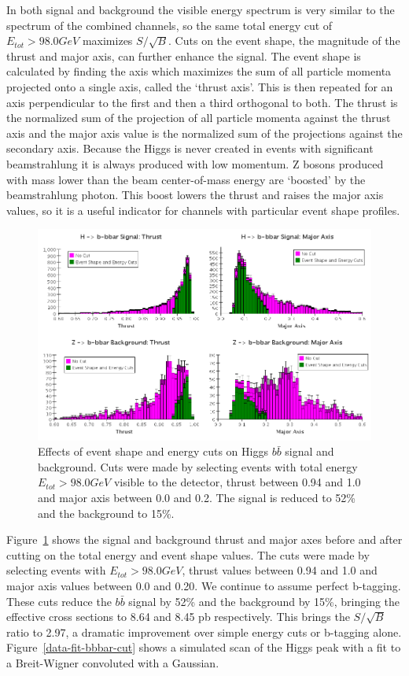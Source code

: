 \documentclass[a4paper]{article}
\begin{document}
	In both signal and background the visible energy spectrum is very similar to the spectrum of the combined channels, so the same total energy cut of $E_{tot}>98.0 GeV$ maximizes $S/\sqrt{B}$. Cuts on the event shape, the magnitude of the thrust and major axis, can further enhance the signal. The event shape is calculated by finding the axis which maximizes the sum of all particle momenta projected onto a single axis, called the `thrust axis'. This is then repeated for an axis perpendicular to the first and then a third orthogonal to both. The thrust is the normalized sum of the projection of all particle momenta against the thrust axis and the major axis value is the normalized sum of the projections against the secondary axis. Because the Higgs is never created in events with significant beamstrahlung it is always produced with low momentum. Z bosons produced with mass lower than the beam center-of-mass energy are `boosted' by the beamstrahlung photon. This boost lowers the thrust and raises the major axis values, so it is a useful indicator for channels with particular event shape profiles.
	
\begin{figure}
	\includegraphics[width=\textwidth]{bbbar-en-thrust-cuts}
	\caption{Effects of event shape and energy cuts on Higgs $b\bar{b}$ signal and background. Cuts were made by selecting events with total energy $E_{tot} > 98.0GeV$ visible to the detector, thrust between 0.94 and 1.0 and major axis between 0.0 and 0.2. The signal is reduced to 52\% and the background to 15\%.}
\label{bbbar-en-thrust-cuts}
\end{figure}

Figure~\ref{bbbar-en-thrust-cuts} shows the signal and background thrust and major axes before and after cutting on the total energy and event shape values. The cuts were made by selecting events with $E_{tot} > 98.0 GeV$, thrust values between 0.94 and 1.0 and major axis values between 0.0 and 0.20. We continue to assume perfect b-tagging. These cuts reduce the $b\bar{b}$ signal by 52\% and the background by 15\%, bringing the effective cross sections to 8.64 and 8.45 pb respectively. This brings the $S/\sqrt{B}$ ratio to 2.97, a dramatic improvement over simple energy cuts or b-tagging alone. Figure~\ref{data-fit-bbbar-cut} shows a simulated scan of the Higgs peak with a fit to a Breit-Wigner convoluted with a Gaussian.
\end{document}
